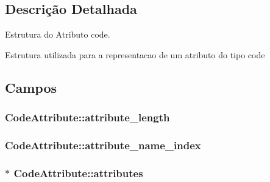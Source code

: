 \subsection{Descrição Detalhada}
Estrutura do Atributo code. 

Estrutura utilizada para a representacao de um atributo do tipo code 

\subsection{Campos}
\subsubsection[{\texorpdfstring{attribute\+\_\+length}{attribute_length}}]{ Code\+Attribute\+::attribute\+\_\+length}\hypertarget{struct_code_attribute_a612405902fb38f8f04e8cd55e875a3a5}{}\label{struct_code_attribute_a612405902fb38f8f04e8cd55e875a3a5}
\subsubsection[{\texorpdfstring{attribute\+\_\+name\+\_\+index}{attribute_name_index}}]{ Code\+Attribute\+::attribute\+\_\+name\+\_\+index}\hypertarget{struct_code_attribute_a87132111c747d163d9b94ec155c1e1db}{}\label{struct_code_attribute_a87132111c747d163d9b94ec155c1e1db}
\subsubsection[{\texorpdfstring{attributes}{attributes}}]{$\ast$ Code\+Attribute\+::attributes}\hypertarget{struct_code_attribute_adafab3efe6d9eefdead891ef70badea8}{}\label{struct_code_attribute_adafab3efe6d9eefdead891ef70badea8}
